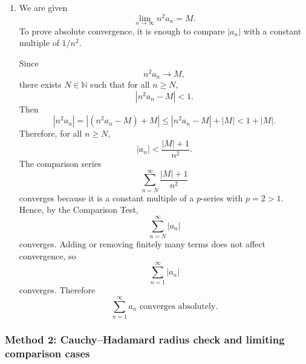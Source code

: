 \documentclass[12pt]{article}
\newcommand{\N}{\mathbb{N}}
\begin{document}
\begin{enumerate}[label=(\alph*)]
Therefore, the interval of convergence is
\[
\boxed{\left[2,\frac83\right).}
\]
The full classification is
\[
\boxed{
\begin{array}{ll}
\text{converges absolutely}, & 2<x<\frac83,\\[0.2em]
\text{converges conditionally}, & x=2,\\[0.2em]
\text{diverges}, & x<2\text{ or }x\ge \frac83.
\end{array}}
\]

\item We are given
\[
\lim_{n\to\infty}n^2a_n=M.
\]
To prove absolute convergence, it is enough to compare $|a_n|$ with a constant multiple of $1/n^2$.

Since
\[
n^2a_n\to M,
\]
there exists $N\in\N$ such that for all $n\ge N$,
\[
|n^2a_n-M|<1.
\]
Then
\[
|n^2a_n|
=
|(n^2a_n-M)+M|
\le
|n^2a_n-M|+|M|
<
1+|M|.
\]
Therefore, for all $n\ge N$,
\[
|a_n|<\frac{|M|+1}{n^2}.
\]
The comparison series
\[
\sum_{n=N}^{\infty}\frac{|M|+1}{n^2}
\]
converges because it is a constant multiple of a $p$-series with $p=2>1$. Hence, by the Comparison Test,
\[
\sum_{n=N}^{\infty}|a_n|
\]
converges. Adding or removing finitely many terms does not affect convergence, so
\[
\sum_{n=1}^{\infty}|a_n|
\]
converges. Therefore
\[
\boxed{\sum_{n=1}^{\infty}a_n\text{ converges absolutely}.}
\]
\end{enumerate}

\newpage
\subsubsection{Method 2: Cauchy--Hadamard radius check and limiting comparison cases}
\end{document}
